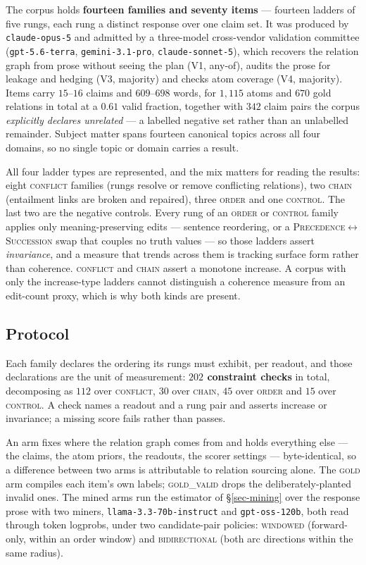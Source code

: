 The corpus holds \textbf{fourteen families and seventy items} --- fourteen ladders of five rungs, each
rung a distinct response over one claim set. It was produced by \texttt{claude-opus-5} and admitted by
a three-model cross-vendor validation committee (\texttt{gpt-5.6-terra}, \texttt{gemini-3.1-pro},
\texttt{claude-sonnet-5}), which recovers the relation graph from prose without seeing the plan (V1,
any-of), audits the prose for leakage and hedging (V3, majority) and checks atom coverage (V4,
majority). Items carry $15$--$16$ claims and $609$--$698$ words, for $1{,}115$ atoms and $670$ gold
relations in total at a $0.61$ valid fraction, together with $342$ claim pairs the corpus
\emph{explicitly declares unrelated} --- a labelled negative set rather than an unlabelled remainder.
Subject matter spans fourteen canonical topics across all four domains, so no single topic or domain
carries a result.

All four ladder types are represented, and the mix matters for reading the results: eight
\textsc{conflict} families (rungs resolve or remove conflicting relations), two \textsc{chain}
(entailment links are broken and repaired), three \textsc{order} and one \textsc{control}. The last
two are the negative controls. Every rung of an \textsc{order} or \textsc{control} family applies only
meaning-preserving edits --- sentence reordering, or a
\textsc{Precedence}$\leftrightarrow$\textsc{Succession} swap that couples no truth values --- so those
ladders assert \emph{invariance}, and a measure that trends across them is tracking surface form
rather than coherence. \textsc{conflict} and \textsc{chain} assert a monotone increase. A corpus with
only the increase-type ladders cannot distinguish a coherence measure from an edit-count proxy, which
is why both kinds are present.

\subsection{Protocol}

Each family declares the ordering its rungs must exhibit, per readout, and those declarations are the
unit of measurement: \textbf{$202$ constraint checks} in total, decomposing as $112$ over
\textsc{conflict}, $30$ over \textsc{chain}, $45$ over \textsc{order} and $15$ over \textsc{control}.
A check names a readout and a rung pair and asserts increase or invariance; a missing score fails
rather than passes.

An arm fixes where the relation graph comes from and holds everything else --- the claims, the atom
priors, the readouts, the scorer settings --- byte-identical, so a difference between two arms is
attributable to relation sourcing alone. The \textsc{gold} arm compiles each item's own labels;
\textsc{gold\_valid} drops the deliberately-planted invalid ones. The mined arms run the estimator of
\S\ref{sec-mining} over the response prose with two miners, \texttt{llama-3.3-70b-instruct} and
\texttt{gpt-oss-120b}, both read through token logprobs, under two candidate-pair policies:
\textsc{windowed} (forward-only, within an order window) and \textsc{bidirectional} (both arc
directions within the same radius).


